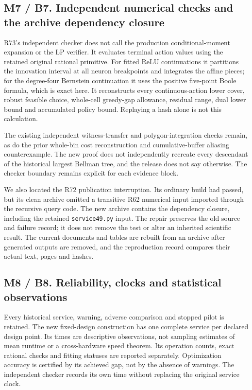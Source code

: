 \hypertarget{m7-b7.-independent-numerical-checks-and-the-archive-dependency-closure}{%
\subsection{M7 / B7. Independent numerical checks and the archive
dependency
closure}\label{m7-b7.-independent-numerical-checks-and-the-archive-dependency-closure}}

R73's independent checker does not call the production
conditional-moment expansion or the LP verifier. It evaluates terminal
action values using the retained original rational primitive. For fitted
ReLU continuations it partitions the innovation interval at all neuron
breakpoints and integrates the affine pieces; for the degree-four
Bernstein continuation it uses the positive five-point Boole formula,
which is exact here. It reconstructs every continuous-action lower
cover, robust feasible choice, whole-cell greedy-gap allowance, residual
range, dual lower bound and accumulated policy bound. Replaying a hash
alone is not this calculation.

The existing independent witness-transfer and polygon-integration checks
remain, as do the prior whole-bin cost reconstruction and
cumulative-buffer aliasing counterexample. The new proof does not
independently recreate every descendant of the historical largest
Bellman tree, and the release does not say otherwise. The checker
boundary remains explicit for each evidence block.

We also located the R72 publication interruption. Its ordinary build had
passed, but its clean archive omitted a transitive R62 numerical input
imported through the recursive query code. The new archive contains the
dependency closure, including the retained \texttt{service49.py} input.
The repair preserves the old source and failure record; it does not
remove the test or alter an inherited scientific result. The current
documents and tables are rebuilt from an archive after generated outputs
are removed, and the reproduction record compares their actual text,
pages and hashes.

\hypertarget{m8-b8.-reliability-clocks-and-statistical-observations}{%
\subsection{M8 / B8. Reliability, clocks and statistical
observations}\label{m8-b8.-reliability-clocks-and-statistical-observations}}

Every historical service, warning, adverse comparison and stopped pilot
is retained. The new fixed-design construction has one complete service
per declared design point. Its times are descriptive observations, not
sampling estimates of mean runtime or a cross-hardware speed theorem.
Its operation counts, exact rational checks and fitting statuses are
reported separately. Optimization accuracy is certified by its achieved
gap, not by the absence of warnings. The independent checker records its
own time without replacing the original service clock.

